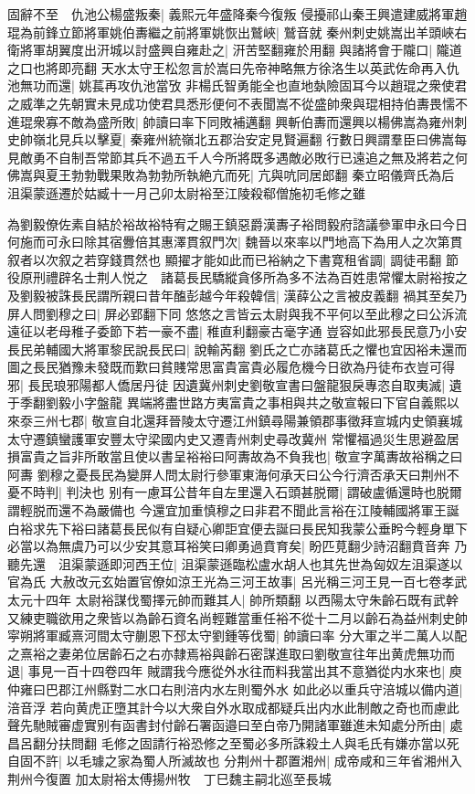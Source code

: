 固辭不至　仇池公楊盛叛秦|{
	義熙元年盛降秦今復叛}
侵擾祁山秦王興遣建威將軍趙琨為前鋒立節將軍姚伯夀繼之前將軍姚恢出鷲峽|{
	鷲音就}
秦州刺史姚嵩出羊頭峽右衛將軍胡翼度出汧城以討盛興自雍赴之|{
	汧苦堅翻雍於用翻}
與諸將會于隴口|{
	隴道之口也將即亮翻}
天水太守王松忽言於嵩曰先帝神略無方徐洛生以英武佐命再入仇池無功而還|{
	姚萇再攻仇池當攷}
非楊氏智勇能全也直地埶險固耳今以趙琨之衆使君之威準之先朝實未見成功使君具悉形便何不表聞嵩不從盛帥衆與琨相持伯夀畏懦不進琨衆寡不敵為盛所敗|{
	帥讀曰率下同敗補邁翻}
興斬伯夀而還興以楊佛嵩為雍州刺史帥嶺北見兵以擊夏|{
	秦雍州統嶺北五郡治安定見賢遍翻}
行數日興謂羣臣曰佛嵩每見敵勇不自制吾常節其兵不過五千人今所將既多遇敵必敗行已遠追之無及將若之何佛嵩與夏王勃勃戰果敗為勃勃所執絶亢而死|{
	亢與吭同居郎翻}
秦立昭儀齊氏為后　沮渠蒙遜遷於姑臧十一月己卯太尉裕至江陵殺郗僧施初毛修之雖

為劉毅僚佐素自結於裕故裕特宥之賜王鎮惡爵漢夀子裕問毅府諮議參軍申永曰今日何施而可永曰除其宿釁倍其惠澤貫叙門次|{
	魏晉以來率以門地高下為用人之次第貫叙者以次叙之若穿錢貫然也}
顯擢才能如此而已裕納之下書寛租省調|{
	調徒弔翻}
節役原刑禮辟名士荆人悦之　諸葛長民驕縱貪侈所為多不法為百姓患常懼太尉裕按之及劉毅被誅長民謂所親曰昔年醢彭越今年殺韓信|{
	漢薛公之言被皮義翻}
禍其至矣乃屏人問劉穆之曰|{
	屏必郢翻下同}
悠悠之言皆云太尉與我不平何以至此穆之曰公泝流遠征以老母稚子委節下若一豪不盡|{
	稚直利翻豪古毫字通}
豈容如此邪長民意乃小安長民弟輔國大將軍黎民說長民曰|{
	說輸芮翻}
劉氏之亡亦諸葛氏之懼也宜因裕未還而圖之長民猶豫未發既而歎曰貧賤常思富貴富貴必履危機今日欲為丹徒布衣豈可得邪|{
	長民琅邪陽都人僑居丹徒}
因遺冀州刺史劉敬宣書曰盤龍狠戾專恣自取夷滅|{
	遺于季翻劉毅小字盤龍}
異端將盡世路方夷富貴之事相與共之敬宣報曰下官自義熙以來沗三州七郡|{
	敬宣自北還拜晉陵太守遷江州鎮尋陽兼領郡事徵拜宣城内史領襄城太守遷鎮蠻護軍安豐太守梁國内史又遷青州刺史尋改冀州}
常懼福過災生思避盈居損富貴之旨非所敢當且使以書呈裕裕曰阿夀故為不負我也|{
	敬宣字萬夀故裕稱之曰阿夀}
劉穆之憂長民為變屏人問太尉行參軍東海何承天曰公今行濟否承天曰荆州不憂不時判|{
	判決也}
别有一慮耳公昔年自左里還入石頭甚脱爾|{
	謂破盧循還時也脱爾謂輕脱而還不為嚴備也}
今還宜加重慎穆之曰非君不聞此言裕在江陵輔國將軍王誕白裕求先下裕曰諸葛長民似有自疑心卿詎宜便去誕曰長民知我蒙公垂盻今輕身單下必當以為無虞乃可以少安其意耳裕笑曰卿勇過賁育矣|{
	盼匹莧翻少詩沼翻賁音奔}
乃聽先還　沮渠蒙遜即河西王位|{
	沮渠蒙遜臨松盧水胡人也其先世為匈奴左沮渠遂以官為氏}
大赦改元玄始置官僚如涼王光為三河王故事|{
	呂光稱三河王見一百七卷孝武太元十四年}
太尉裕謀伐蜀擇元帥而難其人|{
	帥所類翻}
以西陽太守朱齡石既有武幹又練吏職欲用之衆皆以為齡石資名尚輕難當重任裕不從十二月以齡石為益州刺史帥寜朔將軍臧熹河間太守蒯恩下邳太守劉鍾等伐蜀|{
	帥讀曰率}
分大軍之半二萬人以配之熹裕之妻弟位居齡石之右亦隸焉裕與齡石密謀進取曰劉敬宣往年出黄虎無功而退|{
	事見一百十四卷四年}
賊謂我今應從外水往而料我當出其不意猶從内水來也|{
	庾仲雍曰巴郡江州縣對二水口右則涪内水左則蜀外水}
如此必以重兵守涪城以備内道|{
	涪音浮}
若向黄虎正墮其計今以大衆自外水取成都疑兵出内水此制敵之奇也而慮此聲先馳賊審虚實别有函書封付齡石署函邉曰至白帝乃開諸軍雖進未知處分所由|{
	處昌呂翻分扶問翻}
毛修之固請行裕恐修之至蜀必多所誅殺土人與毛氏有嫌亦當以死自固不許|{
	以毛璩之家為蜀人所滅故也}
分荆州十郡置湘州|{
	成帝咸和三年省湘州入荆州今復置}
加太尉裕太傅揚州牧　丁巳魏主嗣北巡至長城

